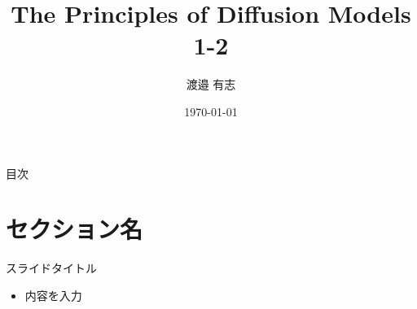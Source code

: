 \documentclass{beamer}
\title{The Principles of Diffusion Models 1-2}
\author{渡邉 有志}
\date{\today}
\begin{document}
\begin{frame}
    \titlepage
\end{frame}

\begin{frame}{目次}
    \tableofcontents
\end{frame}

\section{セクション名}

\begin{frame}{スライドタイトル}
    \begin{itemize}
        \item 内容を入力
    \end{itemize}
\end{frame}
\end{document}
